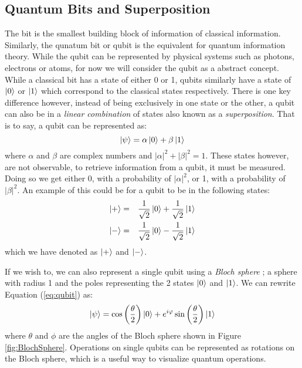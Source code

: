\documentclass[reqno]{amsart}
\numberwithin{equation}{section}
\numberwithin{figure}{section}
\begin{document}
\subsection{Quantum Bits and Superposition} \label{sec:QubitsandSuperposition}
\begin{justify}
    The bit is the smallest building block of information of classical information. Similarly, the qunatum bit or qubit is the equivalent for quantum information theory. \cite{Aaronson2013} While the qubit can be represented by physical systems such as photons, electrons or atoms, for now we will consider the qubit as a abstract concept. \\

    While a classical bit has a state of either 0 or 1, qubits similarly have a state of $\ket{0}$ or $\ket{1}$ which correspond to the classical states respectively. There is one key difference however, instead of being exclusively in one state or the other, a qubit can also be in a \textit{linear combination} of states also known as a \textit{superposition}. That is to say, a qubit can be represented as:
    \begin{equation}
        \ket{\psi} = \alpha\ket{0} + \beta\ket{1} \label{eq:qubit}
    \end{equation}
where $\alpha$ and $\beta$ are complex numbers and $|\alpha|^{2} + |\beta|^{2} = 1$. These states however, are not observable, to retrieve information from a qubit, it must be measured. Doing so we get either 0, with a probability of $|\alpha|^{2}$, or 1, with a probability of $|\beta|^{2}$. An example of this could be for a qubit to be in the following states:
    \begin{eqnarray}
        \ket{+} &=& \frac{1}{\sqrt{2}}\ket{0} + \frac{1}{\sqrt{2}}\ket{1} \label{eqn:+} \\
        \ket{-} &=& \frac{1}{\sqrt{2}}\ket{0} - \frac{1}{\sqrt{2}}\ket{1} \label{eqn:-}
    \end{eqnarray}
which we have denoted as $\ket{+}$ and $\ket{-}$.

If we wish to, we can also represent a single qubit using a \textit{Bloch sphere} \cite{FeynmanRichardVernon1957}; a sphere with radius 1 and the poles representing the 2 states $\ket{0}$ and $\ket{1}$. We can rewrite Equation (\ref{eq:qubit}) as:
    \begin{equation}
        \ket{\psi} = \cos\left(\frac{\theta}{2}\right)\ket{0} + e^{i\varphi}\sin\left(\frac{\theta}{2}\right)\ket{1}
    \end{equation}
where $\theta$ and $\phi$ are the angles of the Bloch sphere shown in Figure \ref{fig:BlochSphere}. Operations on single qubits can be represented as rotations on the Bloch sphere, which is a useful way to visualize quantum operations. \\
    \begin{figure}[h]
        \centering
        \begin{tikzpicture}


\end{tikzpicture}
\end{figure}
\end{justify}
\end{document}
